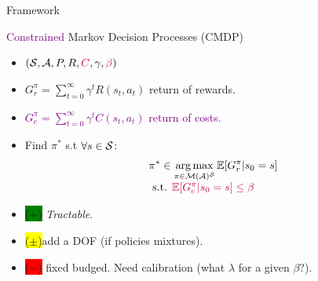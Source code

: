 \documentclass{beamer}
\newcommand{\cplus}{\colorbox{green}{($+$)} }
\newcommand{\cmoins}{\colorbox{red}{($-$)} }
\newcommand{\cmean}{\colorbox{yellow}{($\pm$)}}
\begin{document}
    \begin{frame}{Framework}

        \begin{block}{\textcolor{purple}{Constrained} Markov Decision Processes (CMDP)}
            \begin{itemize}
                \item $(\mathcal{S}, \mathcal{A}, P, R,\textcolor{purple}{C}, \gamma,\textcolor{purple}{\beta})$
                \item $G_r^\pi = \sum_{t=0}^\infty \gamma^t R(s_t, a_t)$ return of rewards.
                \item \textcolor{purple}{ $G_c^\pi = \sum_{t=0}^\infty \gamma^t C(s_t, a_t)$ return of costs.}
                \item Find $\pi^*$ s.t $\forall s\in\mathcal{S}$:
                \begin{equation}
                    \label{eq:cmdp}
                    \begin{array}{lcr}
                        \displaystyle \pi^* \in \operatorname*{arg\,max}_{\pi\in\mathcal{M}(\mathcal{A})^{\mathcal{S}}} \operatorname*{\mathbb{E}}[G_r^\pi | s_0=s] \\
                        \text{ s.t. }  \textcolor{purple}{\operatorname*{\mathbb{E}}[G_c^\pi | s_0=s] \leq \beta}
                    \end{array}
                \end{equation}
            \end{itemize}
        \end{block}

        \begin{block}{}
            \begin{itemize}
                \item \cplus \textit{Tractable}.
                \item \cmean add a DOF (if policies mixtures).%
                \item \cmoins fixed budged. Need calibration (what $\lambda$ for a given $\beta$?).


            \end{itemize}
        \end{block}

    \end{frame}
\end{document}
